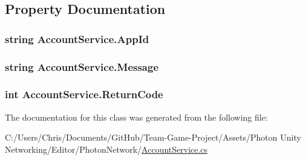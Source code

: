 \subsection{Property Documentation}
\subsubsection[{\texorpdfstring{App\+Id}{AppId}}]{\setlength{\rightskip}{0pt plus 5cm}string Account\+Service.\+App\+Id\hspace{0.3cm}{\ttfamily [get]}}\hypertarget{class_account_service_aac56e602baed20f1f03bd6647da7ce0e}{}\label{class_account_service_aac56e602baed20f1f03bd6647da7ce0e}
\subsubsection[{\texorpdfstring{Message}{Message}}]{\setlength{\rightskip}{0pt plus 5cm}string Account\+Service.\+Message\hspace{0.3cm}{\ttfamily [get]}}\hypertarget{class_account_service_af80209c3fba8bbd0d70a19fac0efda34}{}\label{class_account_service_af80209c3fba8bbd0d70a19fac0efda34}
\subsubsection[{\texorpdfstring{Return\+Code}{ReturnCode}}]{\setlength{\rightskip}{0pt plus 5cm}int Account\+Service.\+Return\+Code\hspace{0.3cm}{\ttfamily [get]}}\hypertarget{class_account_service_a203023d7caa8f3f41cc71bf538903ceb}{}\label{class_account_service_a203023d7caa8f3f41cc71bf538903ceb}


The documentation for this class was generated from the following file\+:\begin{DoxyCompactItemize}
\item 
C\+:/\+Users/\+Chris/\+Documents/\+Git\+Hub/\+Team-\/\+Game-\/\+Project/\+Assets/\+Photon Unity Networking/\+Editor/\+Photon\+Network/\hyperlink{_account_service_8cs}{Account\+Service.\+cs}\end{DoxyCompactItemize}
